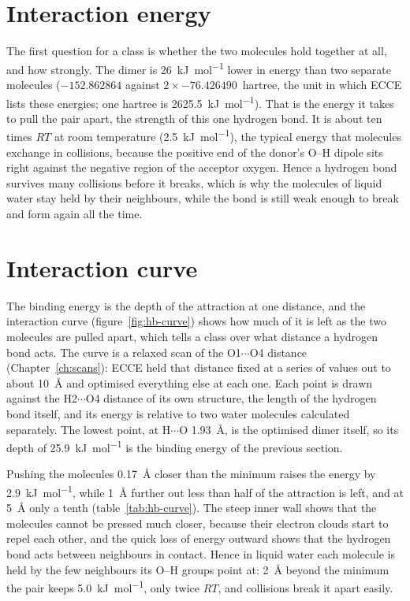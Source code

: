 \section{Interaction energy}
The first question for a class is whether the two molecules hold together at all, and how strongly. The dimer is \SI{26}{kJ.mol^{-1}} lower in energy than two separate molecules ($-152.862864$ against $2\times-76.426490$~hartree, the unit in which ECCE lists these energies; one hartree is \SI{2625.5}{kJ.mol^{-1}}). That is the energy it takes to pull the pair apart, the strength of this one hydrogen bond. It is about ten times $RT$ at room temperature (\SI{2.5}{kJ.mol^{-1}}), the typical energy that molecules exchange in collisions, because the positive end of the donor's O--H dipole sits right against the negative region of the acceptor oxygen. Hence a hydrogen bond survives many collisions before it breaks, which is why the molecules of liquid water stay held by their neighbours, while the bond is still weak enough to break and form again all the time.

\section{Interaction curve}
The binding energy is the depth of the attraction at one distance, and the interaction curve (figure~\ref{fig:hb-curve}) shows how much of it is left as the two molecules are pulled apart, which tells a class over what distance a hydrogen bond acts. The curve is a relaxed scan of the O1$\cdots$O4 distance (Chapter~\ref{ch:scans}): ECCE held that distance fixed at a series of values out to about \SI{10}{\angstrom} and optimised everything else at each one. Each point is drawn against the H2$\cdots$O4 distance of its own structure, the length of the hydrogen bond itself, and its energy is relative to two water molecules calculated separately. The lowest point, at H$\cdots$O \SI{1.93}{\angstrom}, is the optimised dimer itself, so its depth of \SI{25.9}{kJ.mol^{-1}} is the binding energy of the previous section.

Pushing the molecules \SI{0.17}{\angstrom} closer than the minimum raises the energy by \SI{2.9}{kJ.mol^{-1}}, while \SI{1}{\angstrom} further out less than half of the attraction is left, and at \SI{5}{\angstrom} only a tenth (table~\ref{tab:hb-curve}). The steep inner wall shows that the molecules cannot be pressed much closer, because their electron clouds start to repel each other, and the quick loss of energy outward shows that the hydrogen bond acts between neighbours in contact. Hence in liquid water each molecule is held by the few neighbours its O--H groups point at: \SI{2}{\angstrom} beyond the minimum the pair keeps \SI{5.0}{kJ.mol^{-1}}, only twice $RT$, and collisions break it apart easily.

